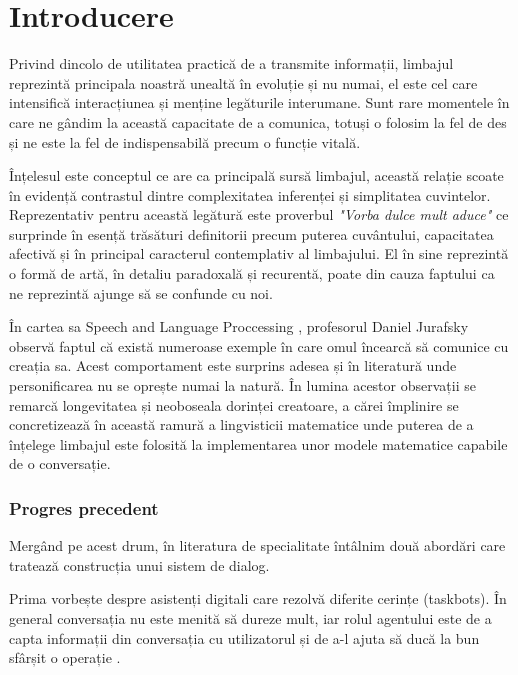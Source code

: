 \chapter{Introducere}


Privind dincolo de utilitatea practică de a transmite informații, limbajul reprezintă principala noastră unealtă în evoluție și nu numai, el este cel care intensifică interacțiunea și menține legăturile interumane. Sunt rare momentele în care ne gândim la această capacitate de a comunica, totuși o folosim la fel de des și ne este la fel de indispensabilă precum o funcție vitală.

Înțelesul este conceptul ce are ca principală sursă limbajul, această relație scoate în evidență contrastul dintre complexitatea inferenței și simplitatea cuvintelor. Reprezentativ pentru această legătură este proverbul \textit{"Vorba dulce mult aduce"} ce surprinde în esență trăsături definitorii precum puterea cuvântului, capacitatea afectivă și în principal caracterul contemplativ al limbajului. El în sine reprezintă o formă de artă, în detaliu paradoxală și recurentă, poate din cauza faptului ca ne reprezintă ajunge să se confunde cu noi.

În cartea sa Speech and Language Proccessing \cite{speech-lang-processing}, profesorul Daniel Jurafsky observă faptul că există numeroase exemple în care omul încearcă să comunice cu creația sa. Acest comportament este surprins adesea și în literatură unde personificarea nu se oprește numai la natură. În lumina acestor observații se remarcă longevitatea și neoboseala dorinței creatoare, a cărei împlinire se concretizează în această ramură a lingvisticii matematice unde puterea de a înțelege limbajul este folosită la implementarea unor modele matematice capabile de o conversație.

\subsection{Progres precedent}
Mergând pe acest drum, în literatura de specialitate întâlnim două abordări care tratează construcția unui sistem de dialog.

Prima vorbește despre asistenți digitali care rezolvă diferite cerințe (taskbots). În general conversația nu este menită să dureze mult, iar rolul agentului este de a capta informații din conversația cu utilizatorul și de a-l ajuta să ducă la bun sfârșit o operație \cite{joint_online_bing, att_joint_bing}.

